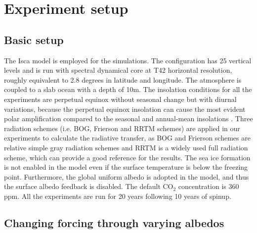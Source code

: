 
\section{Experiment setup}
\label{sec:polar_amiplicaiton_setup}

\subsection{Basic setup}

The Isca model is employed for the simulations. The configuration has 25 vertical levels and is run with spectral dynamical core at T42 horizontal resolution, roughly equivalent to 2.8 degrees in latitude and longitude. The atmosphere is coupled to a slab ocean with a depth of 10m. The insolation conditions for all the experiments are perpetual equinox without seasonal change but with diurnal variations, because the perpetual equinox insolation can cause the most evident polar amplification compared to the seasonal and annual-mean insolations \citep{Kim2018}. Three radiation schemes (i.e. BOG, Frierson and RRTM schemes) are applied in our experiments to calculate the radiative transfer, as BOG and Frierson schemes are relative simple gray radiation schemes and RRTM is a widely used full radiation scheme, which can provide a good reference for the results. The sea ice formation is not enabled in the model even if the surface temperature is below the freezing point. Furthermore, the global uniform albedo is adopted in the model, and thus the surface albedo feedback is disabled. The default CO$_2$ concentration is 360 ppm. All the experiments are run for 20 years following 10 years of spinup.


\subsection{Changing forcing through varying albedos}


